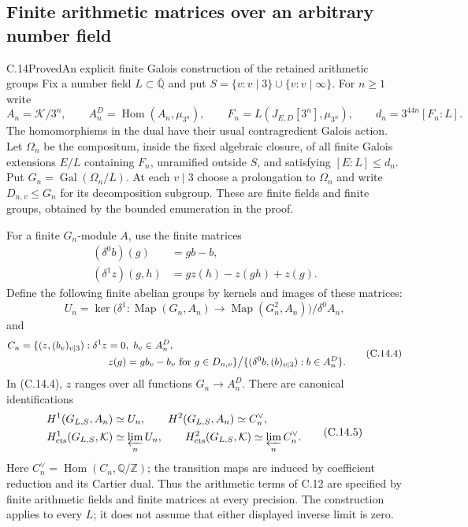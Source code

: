 \subsection{Finite arithmetic matrices over an arbitrary number field}

\begin{statement}{C.14}{Proved}{An explicit finite Galois construction of the retained arithmetic groups}
Fix a number field $L\subset\overline{\mathbb Q}$ and put
$S=\{v:v\mid3\}\cup\{v:v\mid\infty\}$.
For $n\ge1$ write
\[
 A_n=\mathcal K/3^n,\qquad
 A_n^D=\operatorname{Hom}(A_n,\mu_{3^n}),\qquad
 F_n=L(J_{E,D}[3^n],\mu_{3^n}),\qquad
 d_n=3^{44n}[F_n:L].                                      \tag{C.14.1}
\]
The homomorphisms in the dual have their usual contragredient
Galois action. Let $\Omega_n$ be the compositum, inside the
fixed algebraic closure, of all finite Galois extensions $E/L$
containing $F_n$, unramified outside $S$, and satisfying
$[E:L]\le d_n$. Put $G_n=\operatorname{Gal}(\Omega_n/L)$.
At each $v\mid3$ choose a prolongation to $\Omega_n$ and
write $D_{n,v}\le G_n$ for its decomposition subgroup.
These are finite fields and finite groups, obtained by the
bounded enumeration in the proof.

For a finite $G_n$-module $A$, use the finite matrices
\[
 \begin{split}
  (\delta^0 b)(g)&=g b-b,\\
  (\delta^1 z)(g,h)&=g z(h)-z(gh)+z(g).
 \end{split}                                               \tag{C.14.2}
\]
Define the following finite abelian groups by kernels and
images of these matrices:
\[
 U_n=\ker\bigl(\delta^1:\operatorname{Map}(G_n,A_n)
                   \to\operatorname{Map}(G_n^2,A_n)\bigr)
                      /\delta^0 A_n,                       \tag{C.14.3}
\]
and
\[
\begin{split}
 C_n={}&\{(z,(b_v)_{v\mid3}):
       \delta^1z=0,\ b_v\in A_n^D,\\
     &\hspace{26mm}z(g)=g b_v-b_v
             \text{ for }g\in D_{n,v}\}\big/
        \{(\delta^0 b,(b)_{v\mid3}):b\in A_n^D\}.
\end{split}                                                 \tag{C.14.4}
\]
In (C.14.4), $z$ ranges over all functions $G_n\to A_n^D$.
There are canonical identifications
\[
\begin{split}
 H^1(G_{L,S},A_n)&\simeq U_n,\qquad
 H^2(G_{L,S},A_n)\simeq C_n^\vee,\\
 H^1_{\rm cts}(G_{L,S},\mathcal K)&\simeq\varprojlim_n U_n,\qquad
 H^2_{\rm cts}(G_{L,S},\mathcal K)
       \simeq\varprojlim_n C_n^\vee .
\end{split}                                                 \tag{C.14.5}
\]
Here $C_n^\vee=\operatorname{Hom}(C_n,\mathbb Q/\mathbb Z)$;
the transition maps are induced by coefficient reduction
and its Cartier dual. Thus the arithmetic terms of C.12
are specified by finite arithmetic fields and finite matrices
at every precision. The construction applies to every $L$;
it does not assume that either displayed inverse limit is zero.
\end{statement}
